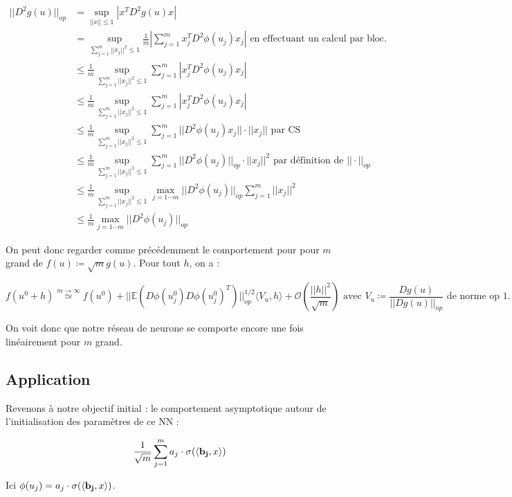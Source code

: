 \documentclass[a4paper, 11pt, french]{article}
\theoremstyle{definition}
\begin{document}
	\begin{align*}
		||D^2 g(u)||_{op} &= \sup_{||x|| \leq 1} |x^T D^2 g(u) x| \\
		&= \sup_{\sum_{j=1}^{m} ||x_j||^2 \leq 1} \frac{1}{m} \left | \sum_{j=1}^{m} x_j^T D^2 \phi (u_j) x_j \right | \text{ en effectuant un calcul par bloc.} \\
		&\leq \frac{1}{m} \sup_{\sum_{j=1}^{m} ||x_j||^2 \leq 1} \sum_{j=1}^{m} \left | x_j^T D^2 \phi (u_j) x_j \right | \\
		&\leq \frac{1}{m} \sup_{\sum_{j=1}^{m} ||x_j||^2 \leq 1} \sum_{j=1}^{m} \left | x_j^T D^2 \phi (u_j) x_j \right | \\
		&\leq \frac{1}{m} \sup_{\sum_{j=1}^{m} ||x_j||^2 \leq 1} \sum_{j=1}^{m} ||D^2 \phi (u_j) x_j|| \cdot ||x_j|| \text{ par CS} \\
		&\leq \frac{1}{m} \sup_{\sum_{j=1}^{m} ||x_j||^2 \leq 1} \sum_{j=1}^{m} ||D^2 \phi (u_j)||_{op} \cdot ||x_j||^2 \text{ par définition de $||\cdot||_{op}$} \\
		&\leq \frac{1}{m} \sup_{\sum_{j=1}^{m} ||x_j||^2 \leq 1} \max_{j=1\cdots m} ||D^2 \phi (u_j)||_{op} \sum_{j=1}^{m} ||x_j||^2 \\
		&\leq \frac{1}{m} \max_{j=1\cdots m} ||D^2 \phi (u_j)||_{op}
	\end{align*}

	On peut donc regarder comme précédemment le comportement pour pour $m$ grand de $f(u) \coloneqq \sqrt m g(u)$. Pour tout $h$, on a :
	
	\[ f(u^0 + h) \stackrel{m \to \infty}{\simeq} f(u^0) + ||\mathbb{E}(D \phi(u^0_j) D \phi(u^0_j)^T)||_{op}^{1/2} \langle V_u, h \rangle + \mathcal{O}\left(\frac{||h||^2}{\sqrt m}\right) \text{ avec $V_u \coloneqq \frac{D g(u)}{||D g(u)||_{op}}$ de norme op 1.} \]
	
	On voit donc que notre réseau de neurone se comporte encore une fois linéairement pour $m$ grand. \\

	\subsection{Application}
	
	Revenons à notre objectif initial : le comportement asymptotique autour de l'initialisation des paramètres de ce NN :
	
	\[ \frac{1}{\sqrt{m}} \sum_{j=1}^{m} a_j \cdot \sigma (\langle {\bf b_j}, x \rangle) \]
	
	Ici $\phi (u_j) = a_j \cdot \sigma (\langle {\bf b_j}, x \rangle)$. \\
	
\end{document}
